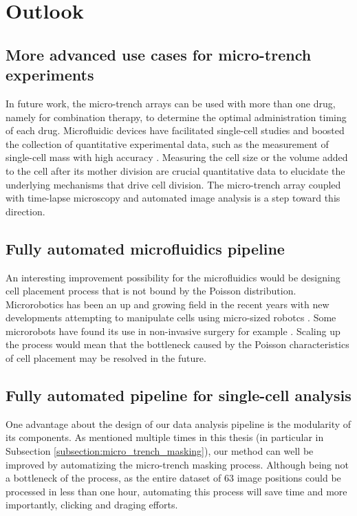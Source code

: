 \documentclass[pdftex,12pt,a4paper]{report}
\begin{document}

\section{Outlook}

\subsection{More advanced use cases for micro-trench experiments}

In future work, the micro-trench arrays can be used with more than one drug, namely for combination therapy, to determine the optimal administration timing of each drug. Microfluidic devices have facilitated single-cell studies and boosted the collection of quantitative experimental data, such as the measurement of single-cell mass with high accuracy \cite{son2012direct}. Measuring the cell size or the volume added to the cell after its mother division are crucial quantitative data to elucidate the underlying mechanisms that drive cell division. The micro-trench array coupled with time-lapse microscopy and automated image analysis is a step toward this direction.

\subsection{Fully automated microfluidics pipeline}

An interesting improvement possibility for the microfluidics would be designing cell placement process that is not bound by the Poisson distribution. Microrobotics has been an up and growing field in the recent years with new developments attempting to manipulate cells using micro-sized robotcs \cite{kim2008nanonewton}. Some microrobots have found its use in non-invasive surgery for example \cite{nelson2010microrobots}. Scaling up the process would mean that the bottleneck caused by the Poisson characteristics of cell placement may be resolved in the future.

\subsection{Fully automated pipeline for single-cell analysis}

One advantage about the design of our data analysis pipeline is the modularity of its components. As mentioned multiple times in this thesis (in particular in Subsection \ref{subsection:micro_trench_masking}), our method can well be improved by automatizing the micro-trench masking process. Although being not a bottleneck of the process, as the entire dataset of 63 image positions could be processed in less than one hour, automating this process will save time and more importantly, clicking and draging efforts.
\end{document}
